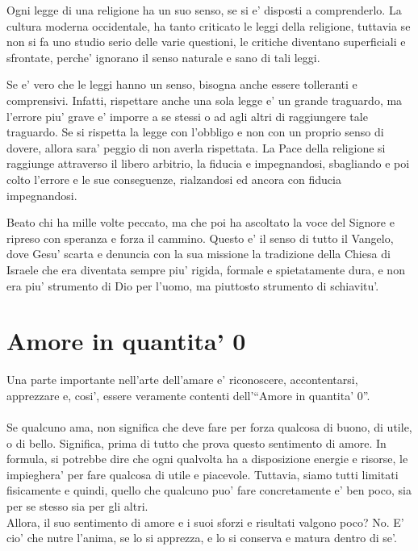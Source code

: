 Ogni legge di una religione ha un suo senso, se si e' disposti a comprenderlo. La cultura moderna occidentale, ha tanto criticato le leggi della religione, tuttavia se non si fa uno studio serio delle varie questioni, le critiche diventano superficiali e sfrontate, perche' ignorano il senso naturale e sano di tali leggi.

Se e' vero che le leggi hanno un senso, bisogna anche essere tolleranti e comprensivi. Infatti, rispettare anche una sola legge e' un grande traguardo, ma l'errore piu' grave e' imporre a se stessi o ad agli altri di raggiungere tale traguardo. Se si rispetta la legge con l'obbligo e non con un proprio senso di dovere, allora sara' peggio di non averla rispettata. La Pace della religione si raggiunge attraverso il libero arbitrio, la fiducia e impegnandosi, sbagliando e poi colto l'errore e le sue conseguenze, rialzandosi ed ancora con fiducia impegnandosi.

Beato chi ha mille volte peccato, ma che poi ha ascoltato la voce del Signore e ripreso con speranza e forza il cammino. Questo e' il senso di tutto il Vangelo, dove Gesu' scarta e denuncia con la sua missione la tradizione della Chiesa di Israele che era diventata sempre piu' rigida, formale e spietatamente dura, e non era piu' strumento di Dio per l'uomo, ma piuttosto strumento di schiavitu'.

\section{Amore in quantita' 0}

Una parte importante nell'arte dell'amare e' riconoscere, accontentarsi, apprezzare e, cosi', essere veramente contenti dell'``Amore in quantita' 0''.\\
\leavevmode\\
Se qualcuno ama, non significa che deve fare per forza qualcosa di buono, di utile, o di bello. Significa, prima di tutto che prova questo sentimento di amore. In formula, si potrebbe dire che ogni qualvolta ha a disposizione energie e risorse, le impieghera' per fare qualcosa di utile e piacevole. Tuttavia, siamo tutti limitati fisicamente e quindi, quello che qualcuno puo' fare concretamente e' ben poco, sia per se stesso sia per gli altri.\\
Allora, il suo sentimento di amore e i suoi sforzi e risultati valgono poco? No. E' cio' che nutre l'anima, se lo si apprezza, e lo si conserva e matura dentro di se'.\\

